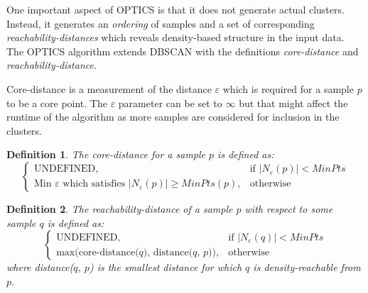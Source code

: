 \documentclass[a4paper]{report}
\newtheorem*{definition}{Definition}
\begin{document}
One important aspect of OPTICS is that it does not generate actual clusters.
Instead, it generates an \emph{ordering} of samples and a set of corresponding
\emph{reachability-distances} which reveals density-based structure in the
input data. The OPTICS algorithm extends DBSCAN with the definitions
\emph{core-distance} and \emph{reachability-distance}.

Core-distance is a measurement of the distance $\varepsilon$ which is required
for a sample $p$ to be a core point. The $\varepsilon$ parameter can be set to
$\infty$ but that might affect the runtime of the algorithm as more samples are
considered for inclusion in the clusters.

\begin{definition}
    The core-distance for a sample $p$ is defined as:
\[
    \begin{cases}
        \text{UNDEFINED}, & \text{if $|N_{\varepsilon}(p)| < MinPts$}\\
        \text{Min $\varepsilon$ which satisfies $|N_{\varepsilon}(p)| \ge
        MinPts$}(p), & \text{otherwise}
    \end{cases}
\]
\end{definition}


\begin{definition}
    The reachability-distance of a sample $p$ with respect to some sample $q$
    is defined as:
\[
    \begin{cases}
        \text{UNDEFINED}, & \text{if $|N_{\varepsilon}(q)| < MinPts$}\\
        \text{max(core-distance($q$), distance($q$, $p$))}, & \text{otherwise}
    \end{cases}
\]
    where distance($q$, $p$) is the smallest distance for which $q$ is
    density-reachable from $p$.
\end{definition}
\end{document}
